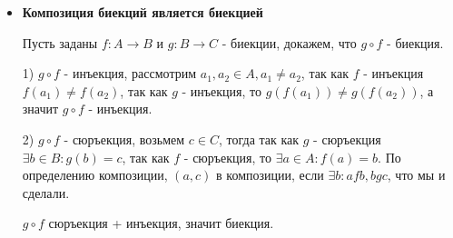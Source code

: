 \begin{itemize}
	\item \textbf{Композиция биекций является биекцией}
	
	Пусть заданы $f : A \to B$ и $g : B \to C$ - биекции, докажем, что $g \circ f$ - биекция.
	
	1) $g \circ f$ - инъекция, рассмотрим $a_1, a_2 \in A, a_1 \neq a_2$, так как $f$ - инъекция $f(a_1) \neq f(a_2)$, так как $g$ - инъекция, то $g(f(a_1)) \neq g(f(a_2))$, а значит $g \circ f$ - инъекция.
	
	2) $g \circ f$ - сюръекция, возьмем $c \in C$, тогда так как $g$ - сюръекция $\exists b \in B : g(b) = c$, так как $f$ - сюръекция, то $\exists a \in A : f(a) = b$. По определению композиции, $(a, c)$ в композиции, если $\exists b : afb, bgc$, что мы и сделали.
	
	$g \circ f$ сюръекция + инъекция, значит биекция. 
\end{itemize}
